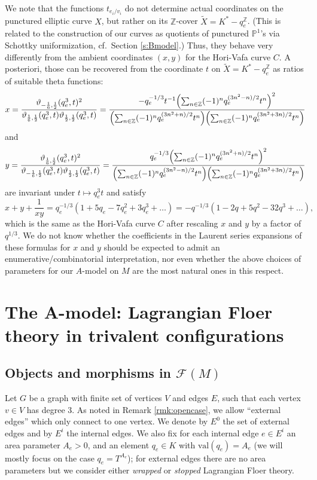 \documentclass[11pt,leqno]{amsart}
\numberwithin{equation}{section}
\def\Z{\mathbb{Z}}
\def\val{\mathrm{val}}
\def\F{{\mathcal F}}
\def\PP{{\mathbb P}}
\begin{document}
We note that the functions $t_{e_i/v_i}$ do not determine actual coordinates on
the punctured elliptic curve $X$, but rather on its $\Z$-cover
$\tilde{X}=K^*- q_e^\Z$. 
(This is related to the
construction of our curves as quotients of punctured $\PP^1$'s via Schottky
uniformization, cf.\ Section \ref{s:Bmodel}.)
Thus, they behave very differently from the ambient coordinates $(x,y)$ for the
Hori-Vafa curve $C$. A posteriori, those can be recovered from the coordinate $t$ on
$\tilde{X}=K^*-q_e^\Z$ as ratios of suitable theta functions:
$$x=\frac{\vartheta_{-\frac16,\frac12}(q_e^3,t)^2}
{\vartheta_{\frac16,\frac12}(q_e^3,t)\vartheta_{\frac12,\frac12}(q_e^3,t)}=
\frac{-q_e^{-1/3}t^{-1}\Bigl(\sum_{n\in\Z}(-1)^n q_e^{(3n^2-n)/2}t^n\Bigr)^2}
{\Bigl(\sum_{n\in\Z}(-1)^n q_e^{(3n^2+n)/2}t^n\Bigr)
\Bigl(\sum_{n\in\Z}(-1)^n q_e^{(3n^2+3n)/2}t^n\Bigr)}$$
and
$$y=\frac{\vartheta_{\frac16,\frac12}(q_e^3,t)^2}
{\vartheta_{-\frac16,\frac12}(q_e^3,t)\vartheta_{\frac12,\frac12}(q_e^3,t)}=
\frac{q_e^{-1/3}\Bigl(\sum_{n\in\Z}(-1)^n q_e^{(3n^2+n)/2}t^n\Bigr)^2}
{\Bigl(\sum_{n\in\Z}(-1)^n q_e^{(3n^2-n)/2}t^n\Bigr)
\Bigl(\sum_{n\in\Z}(-1)^n q_e^{(3n^2+3n)/2}t^n\Bigr)}$$
are invariant under $t\mapsto q_e^{3} t$ and satisfy $$x+y+\frac{1}{xy}=q_e^{-1/3}(1+5q_e-7q_e^2+3q_e^3+\dots)=
-q^{-1/3}(1-2q+5q^2-32q^3+\dots),$$ which is the same as the Hori-Vafa curve
$C$ after rescaling $x$ and $y$ by a factor of $q^{1/3}$.
We do not know whether the coefficients in the
Laurent series expansions of these formulas for $x$ and $y$
should be expected to admit an enumerative/combinatorial interpretation,
nor even whether the above choices of parameters for our $A$-model on $M$ are
the most natural ones in this respect.

\section{The A-model: Lagrangian Floer theory in trivalent configurations} \label{s:Amodel}

\subsection{Objects and morphisms in $\F(M)$}

Let $G$ be a graph with finite set of vertices $V$ and edges $E$, such that
each vertex $v\in V$ has degree 3. As noted in Remark \ref{rmk:opencase}, we
allow ``external edges'' which only connect to one vertex.
We denote by $E^0$ the
set of external edges and by $E^i$ the internal edges. We also fix for
each internal edge $e\in E^i$ an area parameter $A_e>0$, and an element $q_e\in K$
with $\val(q_e)=A_e$ (we will mostly focus on the case $q_e=T^{A_e}$); for external edges there are no 
area parameters but we consider either {\em wrapped} or {\em stopped}
Lagrangian Floer theory.
\end{document}

